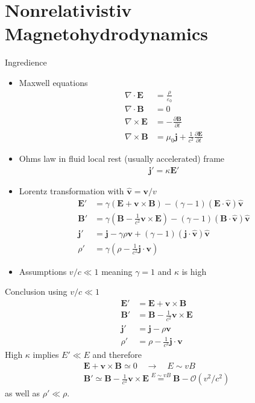\documentclass[10pt,a4paper]{book}
\theoremstyle{definition}
\begin{document}
\section{Nonrelativistiv Magnetohydrodynamics}
Ingredience
\begin{itemize}
\item Maxwell equations
\begin{align}
\nabla\cdot\mathbf{E}&=\frac{\rho}{\varepsilon_0}\\
\nabla\cdot\mathbf{B}&=0\\
\nabla\times\mathbf{E}&=-\frac{\partial\mathbf{B}}{\partial t}\\
\nabla\times\mathbf{B}&=\mu_0\mathbf{j}+\frac{1}{c^2}\frac{\partial\mathbf{E}}{\partial t}
\end{align}
\item Ohms law in fluid local rest (usually accelerated) frame 
\begin{align}
\mathbf{j}'=\kappa\mathbf{E}'
\end{align}
\item Lorentz transformation with $\mathbf{\hat{v}}=\mathbf{v}/v$
\begin{align}
\mathbf{E}'&=\gamma\left(\mathbf{E}+\mathbf{v}\times\mathbf{B}\right)-(\gamma-1)(\mathbf{E}\cdot\mathbf{\hat{v}})\mathbf{\hat{v}}\\
\mathbf{B}'&=\gamma\left(\mathbf{B}-\frac{1}{c^2}\mathbf{v}\times\mathbf{E}\right)-(\gamma-1)(\mathbf{B}\cdot\mathbf{\hat{v}})\mathbf{\hat{v}}\\
\mathbf{j}'&=\mathbf{j}-\gamma\rho\mathbf{v}+(\gamma-1)(\mathbf{j}\cdot\mathbf{\hat{v}})\mathbf{\hat{v}}\\
\rho'&=\gamma\left(\rho-\frac{1}{c^2}\mathbf{j}\cdot\mathbf{v}\right)
\end{align}
\item Assumptions $v/c\ll 1$ meaning $\gamma=1$ and $\kappa$ is high
\end{itemize}
Conclusion using $v/c\ll1$
\begin{align}
\mathbf{E}'&=\mathbf{E}+\mathbf{v}\times\mathbf{B}\\
\mathbf{B}'&=\mathbf{B}-\frac{1}{c^2}\mathbf{v}\times\mathbf{E}\\
\mathbf{j}'&=\mathbf{j}-\rho\mathbf{v}\\
\rho'&=\rho-\frac{1}{c^2}\mathbf{j}\cdot\mathbf{v}
\end{align}
High $\kappa$ implies $E'\ll E$ and therefore
\begin{align}
\mathbf{E}+\mathbf{v}\times\mathbf{B}\simeq0\quad\rightarrow\quad E\sim vB\\
\mathbf{B}'\simeq\mathbf{B}-\frac{1}{c^2}\mathbf{v}\times\mathbf{E}\overset{E\sim vB}{=}\mathbf{B}-\mathcal{O}(v^2/c^2)
\end{align}
as well as $\rho'\ll \rho$.
\end{document}
